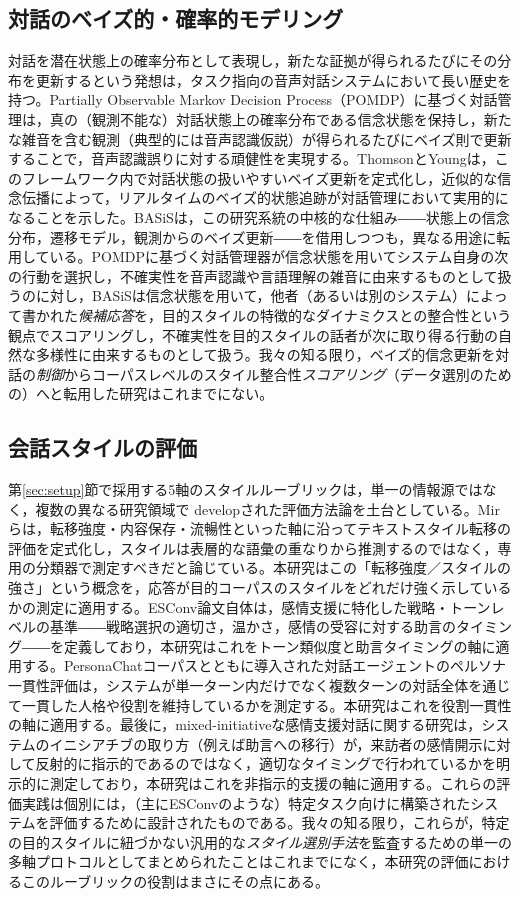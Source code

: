 \documentclass[manuscript,review,anonymous]{acmart}
\begin{document}
\subsection{対話のベイズ的・確率的モデリング}
対話を潜在状態上の確率分布として表現し，新たな証拠が得られるたびにその分布を更新するという発想は，タスク指向の音声対話システムにおいて長い歴史を持つ。Partially Observable Markov Decision Process（POMDP）に基づく対話管理は，真の（観測不能な）対話状態上の確率分布である信念状態を保持し，新たな雑音を含む観測（典型的には音声認識仮説）が得られるたびにベイズ則で更新することで，音声認識誤りに対する頑健性を実現する\cite{young2013pomdp}。ThomsonとYoungは，このフレームワーク内で対話状態の扱いやすいベイズ更新を定式化し，近似的な信念伝播によって，リアルタイムのベイズ的状態追跡が対話管理において実用的になることを示した\cite{thomson2010bayesian}。BASiSは，この研究系統の中核的な仕組み――状態上の信念分布，遷移モデル，観測からのベイズ更新――を借用しつつも，異なる用途に転用している。POMDPに基づく対話管理器が信念状態を用いてシステム自身の次の行動を選択し，不確実性を音声認識や言語理解の雑音に由来するものとして扱うのに対し，BASiSは信念状態を用いて，他者（あるいは別のシステム）によって書かれた\emph{候補応答}を，目的スタイルの特徴的なダイナミクスとの整合性という観点でスコアリングし，不確実性を目的スタイルの話者が次に取り得る行動の自然な多様性に由来するものとして扱う。我々の知る限り，ベイズ的信念更新を対話の\emph{制御}からコーパスレベルのスタイル整合性\emph{スコアリング}（データ選別のための）へと転用した研究はこれまでにない。

\subsection{会話スタイルの評価}
第\ref{sec:setup}節で採用する5軸のスタイルルーブリックは，単一の情報源ではなく，複数の異なる研究領域で developされた評価方法論を土台としている。Mirらは，転移強度・内容保存・流暢性といった軸に沿ってテキストスタイル転移の評価を定式化し，スタイルは表層的な語彙の重なりから推測するのではなく，専用の分類器で測定すべきだと論じている\cite{mir2019styletransfer}。本研究はこの「転移強度／スタイルの強さ」という概念を，応答が目的コーパスのスタイルをどれだけ強く示しているかの測定に適用する。ESConv論文自体は，感情支援に特化した戦略・トーンレベルの基準――戦略選択の適切さ，温かさ，感情の受容に対する助言のタイミング――を定義しており，本研究はこれをトーン類似度と助言タイミングの軸に適用する\cite{liu2021esconv}。PersonaChatコーパスとともに導入された対話エージェントのペルソナ一貫性評価は，システムが単一ターン内だけでなく複数ターンの対話全体を通じて一貫した人格や役割を維持しているかを測定する\cite{zhang2018persona}。本研究はこれを役割一貫性の軸に適用する。最後に，mixed-initiativeな感情支援対話に関する研究は，システムのイニシアチブの取り方（例えば助言への移行）が，来訪者の感情開示に対して反射的に指示的であるのではなく，適切なタイミングで行われているかを明示的に測定しており\cite{deng2023mixedinitiative}，本研究はこれを非指示的支援の軸に適用する。これらの評価実践は個別には，（主にESConvのような）特定タスク向けに構築されたシステムを評価するために設計されたものである。我々の知る限り，これらが，特定の目的スタイルに紐づかない汎用的な\emph{スタイル選別手法}を監査するための単一の多軸プロトコルとしてまとめられたことはこれまでになく，本研究の評価におけるこのルーブリックの役割はまさにその点にある。
\end{document}
